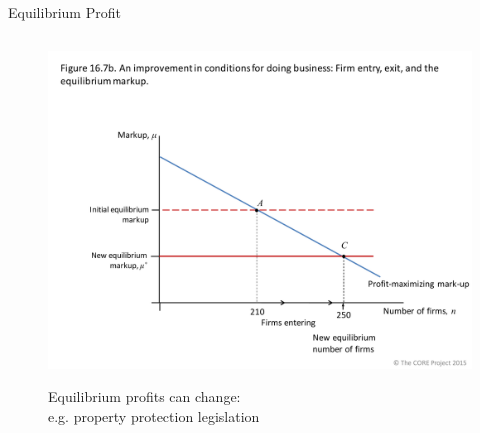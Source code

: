 \documentclass[11pt,aspectratio=43,usenames,dvipsnames]{beamer}
\theoremstyle{definition}
\begin{document}
\begin{frame}{Equilibrium Profit}
\begin{columns}
\begin{column}{0.7\textwidth}
\begin{figure}
{                \includegraphics[width=\textwidth]{./figures/8.pdf}
                \begin{center}
                    Equilibrium profits can change: \\ e.g. property protection legislation
                \end{center}
                }
            \end{figure}
        \end{column}
    \end{columns}

\end{frame}
\end{document}

